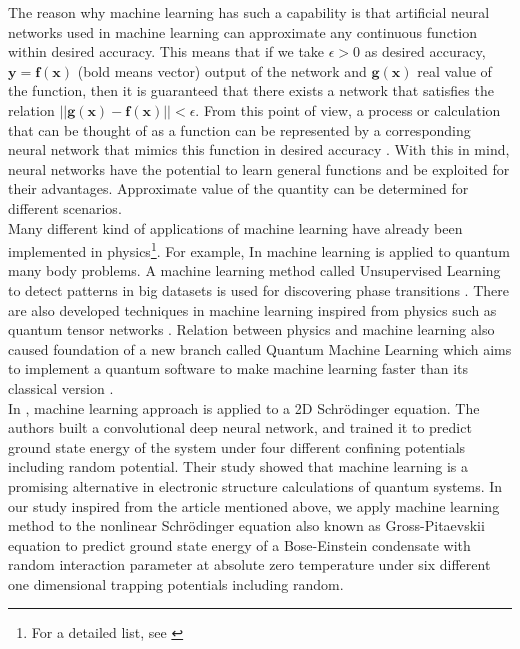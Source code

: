 \documentclass[a4paper,times,hidelinks,12pt]{article}
\begin{document}
The reason why machine learning has such a capability is that artificial neural networks used in machine learning can approximate any continuous function within desired accuracy. This means that if we take $\epsilon > 0$ as desired accuracy,  $\boldsymbol{y} = \boldsymbol{f}(\boldsymbol{x})$ (bold means vector) output of the network and $\boldsymbol{g}(\boldsymbol{x})$ real value of the function, then it is guaranteed that there exists a network that satisfies the relation $||\boldsymbol{g}(\boldsymbol{x}) - \boldsymbol{f}(\boldsymbol{x})|| < \epsilon $. From this point of view, a process or calculation that can be thought of as a function can be represented by a corresponding neural network that mimics this function in desired accuracy \cite{nielsen2015neural}. With this in mind, neural networks have the potential to learn general functions and be exploited for their advantages. Approximate value of the quantity can be determined for different scenarios. \\

Many different kind of applications of machine learning have already been implemented in physics\footnote{For a detailed list, see \cite{physicsml}}. For example, In \cite{carleo2017solving, cai2017approximating} machine learning is applied to quantum many body problems. A machine learning method called Unsupervised Learning to detect patterns in big datasets is used for discovering phase transitions \cite{wang2016discovering}. There are also developed techniques in machine learning inspired from physics such as quantum tensor networks \cite{stoudenmire2016supervised}. Relation between physics and machine learning also caused foundation of a new branch called Quantum Machine Learning which aims to implement a quantum software to make machine learning faster than its classical version \cite{biamonte1611quantum}. \\

In \cite{mills2017deep}, machine learning approach is applied to a 2D Schr{\"o}dinger equation. The authors built a convolutional deep neural network, and trained it to predict ground state energy of the system under four different confining potentials including random potential. Their study showed that machine learning is a promising alternative in electronic structure calculations of quantum systems. In our study inspired from the article mentioned above, we apply machine learning method to the nonlinear Schr{\"o}dinger equation also known as Gross-Pitaevskii equation to predict ground state energy of a Bose-Einstein condensate with random interaction parameter at absolute zero temperature under six different one dimensional trapping potentials including random. 
\end{document}

